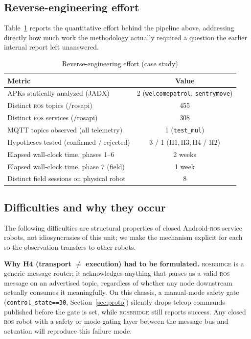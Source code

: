 \documentclass[conference]{IEEEtran}
\newcommand{\ros}{\textsc{ros}}
\newcommand{\rosbridge}{\textsc{rosbridge}}
\begin{document}
\subsection{Reverse-engineering effort}
\label{sec:re-effort}

Table~\ref{tab:re-effort} reports the quantitative effort behind the pipeline above, addressing directly how much work the methodology actually required a question the earlier internal report left unanswered.

\begin{table}[!t]
\caption{Reverse-engineering effort (case study)}
\label{tab:re-effort}
\centering
\scriptsize
\begin{tabular}{@{}lc@{}}
\toprule
\textbf{Metric} & \textbf{Value} \\
\midrule
APKs statically analyzed (JADX) & 2 (\texttt{welcomepatrol}, \texttt{sentrymove}) \\
Distinct \ros{} topics (/rosapi) & 455 \\
Distinct \ros{} services (/rosapi) & 308 \\
MQTT topics observed (all telemetry) & 1 (\texttt{test\_mul}) \\
Hypotheses tested (confirmed / rejected) & 3 / 1 (H1,\,H3,\,H4 / H2) \\
Elapsed wall-clock time, phases 1--6 & 2 weeks \\
Elapsed wall-clock time, phase 7 (field) & 1 week \\
Distinct field sessions on physical robot & 8 \\
\bottomrule
\end{tabular}
\end{table}

\subsection{Difficulties and why they occur}
\label{sec:re-difficulties}

The following difficulties are structural properties of closed Android-\ros{} service robots, not idiosyncrasies of this unit; we make the mechanism explicit for each so the observation transfers to other robots.

\textbf{Why H4 (transport $\neq$ execution) had to be formulated.} \rosbridge{} is a generic message router; it acknowledges anything that parses as a valid \ros{} message on an advertised topic, regardless of whether any node downstream actually consumes it meaningfully. On this chassis, a manual-mode safety gate (\texttt{control\_state==30}, Section~\ref{sec:proto}) silently drops teleop commands published before the gate is set, while \rosbridge{} still reports success. Any closed \ros{} robot with a safety or mode-gating layer between the message bus and actuation will reproduce this failure mode.
\end{document}
